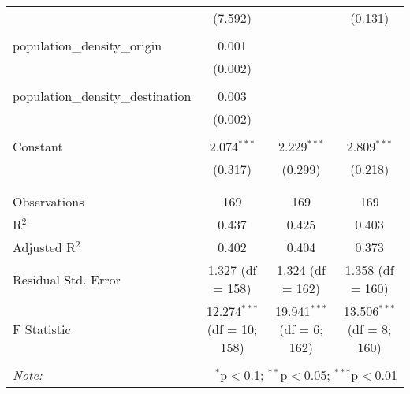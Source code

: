 \begin{table}[!htbp]
\begin{tabular}{@{\extracolsep{5pt}}lccc}
  & (7.592) &  & (0.131) \\ 
  & & & \\ 
 population\_density\_origin & 0.001 &  &  \\ 
  & (0.002) &  &  \\ 
  & & & \\ 
 population\_density\_destination & 0.003 &  &  \\ 
  & (0.002) &  &  \\ 
  & & & \\ 
 Constant & 2.074$^{***}$ & 2.229$^{***}$ & 2.809$^{***}$ \\ 
  & (0.317) & (0.299) & (0.218) \\ 
  & & & \\ 
\hline \\[-1.8ex] 
Observations & 169 & 169 & 169 \\ 
R$^{2}$ & 0.437 & 0.425 & 0.403 \\ 
Adjusted R$^{2}$ & 0.402 & 0.404 & 0.373 \\ 
Residual Std. Error & 1.327 (df = 158) & 1.324 (df = 162) & 1.358 (df = 160) \\ 
F Statistic & 12.274$^{***}$ (df = 10; 158) & 19.941$^{***}$ (df = 6; 162) & 13.506$^{***}$ (df = 8; 160) \\ 
\hline 
\hline \\[-1.8ex] 
\textit{Note:}  & \multicolumn{3}{r}{$^{*}$p$<$0.1; $^{**}$p$<$0.05; $^{***}$p$<$0.01} \\ 
\end{tabular} 
\end{table} 
